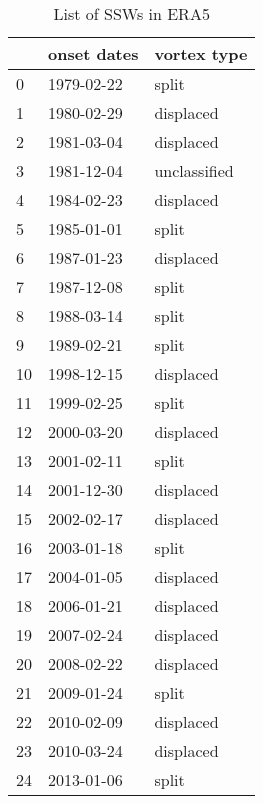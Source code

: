 \begin{table}
\caption{List of SSWs in ERA5}
\label{tab:ssws_ERA5}
\begin{tabular}{lll}
\toprule
 & onset dates & vortex type \\
\midrule
0 & 1979-02-22 & split \\
1 & 1980-02-29 & displaced \\
2 & 1981-03-04 & displaced \\
3 & 1981-12-04 & unclassified \\
4 & 1984-02-23 & displaced \\
5 & 1985-01-01 & split \\
6 & 1987-01-23 & displaced \\
7 & 1987-12-08 & split \\
8 & 1988-03-14 & split \\
9 & 1989-02-21 & split \\
10 & 1998-12-15 & displaced \\
11 & 1999-02-25 & split \\
12 & 2000-03-20 & displaced \\
13 & 2001-02-11 & split \\
14 & 2001-12-30 & displaced \\
15 & 2002-02-17 & displaced \\
16 & 2003-01-18 & split \\
17 & 2004-01-05 & displaced \\
18 & 2006-01-21 & displaced \\
19 & 2007-02-24 & displaced \\
20 & 2008-02-22 & displaced \\
21 & 2009-01-24 & split \\
22 & 2010-02-09 & displaced \\
23 & 2010-03-24 & displaced \\
24 & 2013-01-06 & split \\
\bottomrule
\end{tabular}
\end{table}

